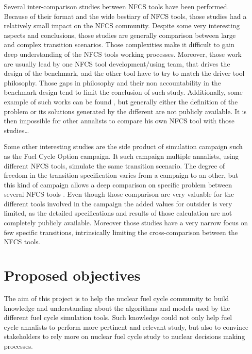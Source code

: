 Several inter-comparison studies between NFCS tools have been performed. Because
of their format and the wide bestiary of NFCS tools, those studies had a
relatively small impact on the NFCS community. Despite some very interesting
aspects and conclusions, those studies are generally comparison between large
and complex transition scenarios. Those complexities make it difficult to gain
deep understanding of the NFCS tools working processes. Moreover, those work are
usually lead by one NFCS tool development/using team, that drives the design of
the benchmark, and the other tool have to try to match the driver tool
philosophy. Those gaps in philosophy and their non accountability in the
benchmark design tend to limit the conclusion of such study. Additionally, some
example of such works can be found \cite{IAEA - Benchmark Study on Nuclear Fuel Cycle
Transition Scenarios} \cite{MIT - Guerin}, but generally either the definition
of the problem or its solutions generated by the different are not publicly
available. It is then impossible for other annalists to compare his own NFCS tool with
those studies\ldots

Some other interesting studies are the side product of simulation campaign such
as the Fuel Cycle Option campaign. It such campaign multiple annalists, using
different NFCS tools, simulate the same transition scenario. The degree of
freedom in the transition specification varies from a campaign to an other, but
this kind of campaign allows a deep comparison on specific problem between
several NFCS tools \cite{Standardized verification of fuel cycle modeling -
B.Feng}.  Even though those comparison are very valuable for the different tools
involved in the campaign the added values for outsider is very limited, as the
detailed specifications and results of those calculation are not completely
publicly available. Moreover those studies have a very narrow focus on few
specific transitions, intrinsically limiting the cross-comparison between the
NFCS tools. 

\section{Proposed objectives}

The aim of this project is to help the nuclear fuel cycle community to build
knowledge and understanding about the algorithms and models used by the
different fuel cycle simulation tools. Such knowledge could not only help fuel
cycle annalists to perform more pertinent and relevant study, but also to convince
stakeholders to rely more on nuclear fuel cycle study to nuclear decisions
making processes.

